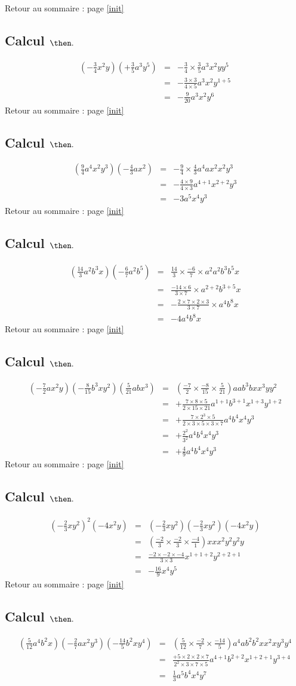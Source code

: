 \documentclass[14pt]{article}
\theoremstyle{remark}
\newcounter{n}
\renewcommand{\it}{Retour au sommaire : page \ref{init}
	\subsection{Calcul $ \mathbf{ \then}.$}\label{\then} \stepcounter{n} }
\theoremstyle{plain}
\begin{document}
\it \begin{eqnarray*}\left(-\frac34x^2y\right)\left(+\frac35a^3y^5\right)&=&-\frac34\times\frac35 a^3x^2yy^5\\
&=& -\frac{3\times3}{4\times5}a^3x^2y^{1+5}\\
&=& - \frac9{20}a^3x^2y^6
 \end{eqnarray*}
\it \begin{eqnarray*}\left(\frac94a^4x^2y^3\right)\left(-\frac43ax^2\right)&=& -\frac94\times\frac43a^4ax^2x^2y^3\\
&=&-\frac{4\times9}{4\times3}a^{4+1}x^{2+2}y^3\\
&=& - 3a^5x^4y^3
\end{eqnarray*}
\it \begin{eqnarray*}\left(\frac{14}3a^2b^3x\right)\left(-\frac67a^2b^5\right)&=& 
\frac{14}3\times\frac{-6}7\times a^2a^2b^3b^5x\\
&=& \frac{-14\times 6}{3\times7}\times a^{2+2}b^{3+5}x\\
&=& - \frac{2\times7\times2\times3}{3\times 7} \times a^4b^8x\\
&=& - 4a^4b^8x\end{eqnarray*}
\it \begin{eqnarray*}\left(-\frac72ax^2y\right)\left(-\frac8{15}b^3xy^2\right)\left(\frac5{21}abx^3\right)&=&
\left(\frac{-7}2\times\frac{-8}{15}\times \frac{5}{21}\right)aab^3bxx^3yy^2\\
&=& +\frac{7\times8\times5}{2\times15\times21}a^{1+1}b^{3+1}x^{1+3}y^{1+2}\\
&=& +\frac{7\times2^3\times5}{2\times3\times5\times3\times7}a^4b^4x^4y^3\\
&=& +\frac{2^2}{3^2}a^4b^4x^4y^3\\
&=& +\frac49a^4b^4x^4y^3
\end{eqnarray*}
\it \begin{eqnarray*}\left(-\frac23xy^2\right)^2(-4x^2y)&=& 
\left(-\frac23xy^2\right)\left(-\frac23xy^2\right)(-4x^2y)\\
&=& \left(\frac{-2}3\times\frac{-2}3\times\frac{-4}1\right)xxx^2y^2y^2y\\
&=&\frac{-2\times-2\times-4}{3\times3}x^{1+1+2}y^{2+2+1}\\
&=& -\frac{16}9x^4y^5
\end{eqnarray*}
\it \begin{eqnarray*}\left(\frac5{12}a^4b^2x\right)\left(-\frac27ax^2y^3\right)\left(-\frac{14}5b^2xy^4\right)&=& 
\left(\frac5{12}\times\frac{-2}7\times\frac{-14}5\right)a^4ab^2b^2xx^2xy^3y^4\\
&=& \frac{+5\times2\times2\times7}{2^2\times3\times7\times5}a^{4+1}b^{2+2}x^{1+2+1}y^{3+4}\\
&=& \frac13a^5b^4x^4y^7
\end{eqnarray*}
\end{document}
